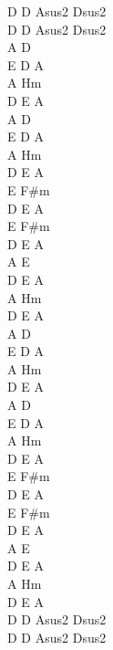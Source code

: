 \begin{chord}
D D Asus2 Dsus2\\
D D Asus2 Dsus2\\
A D\\
E D A\\
A Hm\\
D E A\\
A D\\
E D A\\
A Hm\\
D E A\\

E F#m\\
D E A\\
E F#m\\
D E A\\

A E\\
D E A \\
A Hm\\
D E A \\

A D\\
E D A\\
A Hm\\
D E A\\
A D\\
E D A\\
A Hm\\
D E A\\

E F#m\\
D E A\\
E F#m\\
D E A\\

A E\\
D E A \\
A Hm\\
D E A \\
D D Asus2 Dsus2\\
D D Asus2 Dsus2\\
\end{chord}
